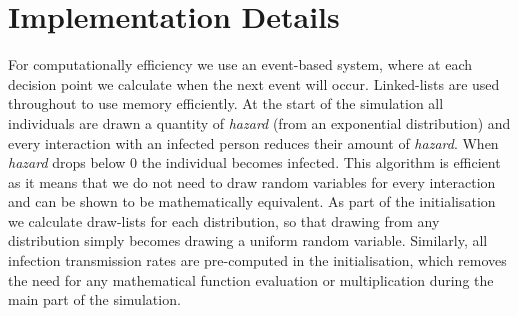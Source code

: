 \documentclass[11pt, oneside]{amsart}   	%
\begin{document}
\section{Implementation Details}
For computationally efficiency we use an event-based system, where at each decision point we calculate when the next event will occur.
Linked-lists are used throughout to use memory efficiently.
At the start of the simulation all individuals are drawn a quantity of {\it hazard} (from an exponential distribution) and every interaction with an infected person reduces their amount of {\it hazard}. When {\it hazard} drops below 0 the individual becomes infected. This algorithm is efficient as it means that we do not need to draw random variables for every interaction and can be shown to be mathematically equivalent.
As part of the initialisation we calculate draw-lists for each distribution, so that drawing from any distribution simply becomes drawing a uniform random variable.
Similarly, all infection transmission rates are pre-computed in the initialisation, which removes the need for any mathematical function evaluation or multiplication during the main part of the simulation.


\renewcommand{\bibname}{References}

 
\end{document}
